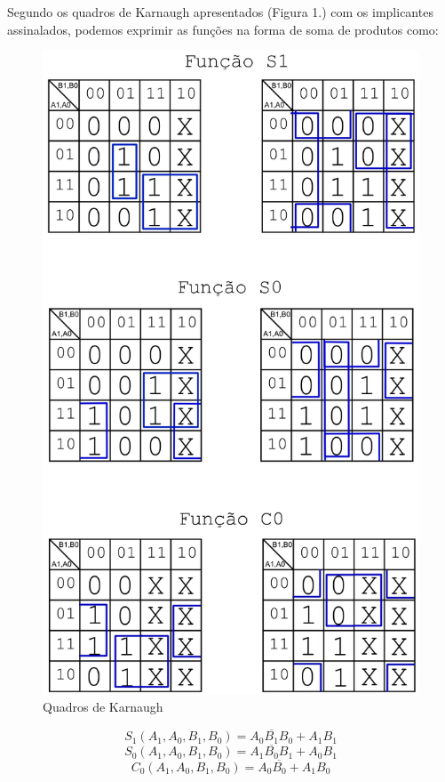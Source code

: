 \documentclass[a4paper,12pt]{article}
\begin{document}
Segundo os quadros de Karnaugh apresentados (Figura 1.) com os implicantes assinalados, podemos exprimir as funções na forma de soma de produtos como:
\begin{figure}[h]
\caption{Quadros de Karnaugh}
\begin{center}
\includegraphics[scale=.27]{k3x.png}
\end{center}
\end{figure}

\begin{equation}
S_1(A_1,A_0,B_1,B_0) = A_0\overline{B_1}B_0 + A_1B_1
\end{equation}
\begin{equation}
S_0(A_1,A_0,B_1,B_0) = A_1\overline{B_0}B_1 + A_0B_1
\end{equation}
\begin{equation}
C_0(A_1,A_0,B_1,B_0) = A_0\overline{B_0} + A_1B_0
\end{equation}
\end{document}
